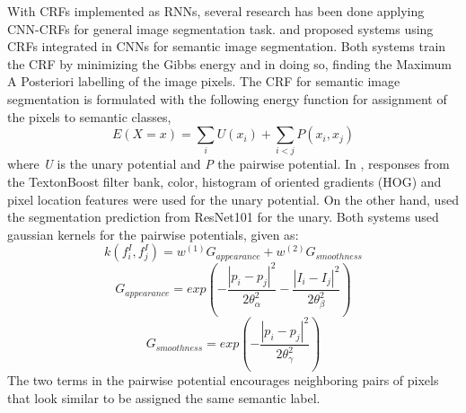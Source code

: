 \documentclass[10pt, journal, compsoc]{IEEEtran}
\begin{document}
With CRFs implemented as RNNs, several research has been done applying CNN-CRFs for general image segmentation task. \cite{NIPS2011_4296} and \cite{Teichmann2018ConvolutionalCF} proposed systems using CRFs integrated in CNNs for semantic image segmentation. Both systems train the CRF by minimizing the Gibbs energy and in doing so, finding the Maximum A Posteriori labelling of the image pixels. The CRF for semantic image segmentation is formulated with the following energy function for assignment of the pixels to semantic classes,
\begin{equation}
E(X = x) = \sum_i U(x_i) + \sum_{i<j}P(x_i,x_j)
\end{equation}
where \textit{U} is the unary potential and \textit{P} the pairwise potential. In \cite{NIPS2011_4296}, responses from the TextonBoost filter bank, color, histogram of oriented gradients (HOG) and pixel location features were used for the unary potential. On the other hand, \cite{Teichmann2018ConvolutionalCF} used the segmentation prediction from ResNet101 for the unary. Both systems used gaussian kernels for the pairwise potentials, given as:
\begin{equation}
k(f_i^I,f_j^I) = w^{(1)}G_{appearance} + w^{(2)}G_{smoothness}
\end{equation}
\begin{equation}
G_{appearance} = exp\left(-\frac{|p_i - p_j|^2}{2\theta_\alpha^2} - \frac{|I_i - I_j|^2}{2\theta_\beta^2}\right)
\end{equation}
\begin{equation}
G_{smoothness} = exp\left(-\frac{|p_i - p_j|^2}{2\theta_\gamma^2}\right)
\end{equation}
The two terms in the pairwise potential encourages neighboring pairs of pixels that look similar to be assigned the same semantic label.
\end{document}
